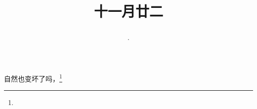 \title{\date[d=22,m=12,y=2024][year:cn-y,年,month:cn,day:cn,日,·,weekday]·十一月廿二 }
自然也变坏了吗，\footnote{ }

